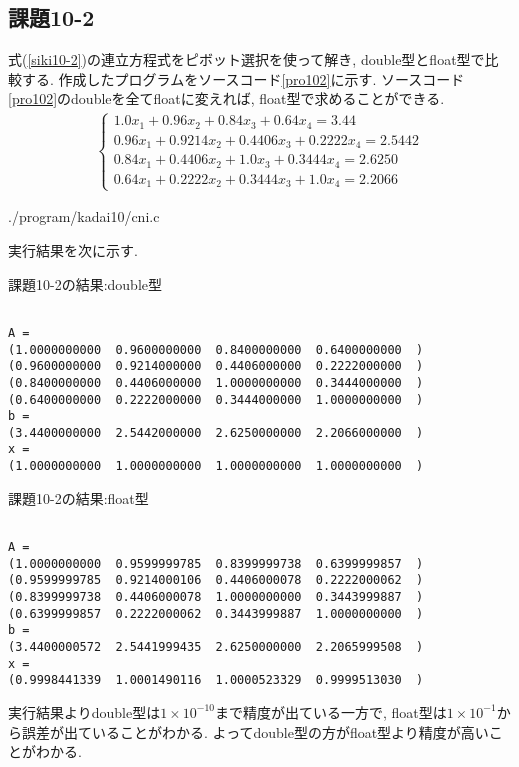 \documentclass[a4j]{jsarticle}
\begin{document}
\subsection{課題10-2}
式(\ref{siki10-2})の連立方程式をピボット選択を使って解き,
double型とfloat型で比較する.
作成したプログラムをソースコード\ref{pro102}に示す.
ソースコード\ref{pro102}のdoubleを全てfloatに変えれば,
float型で求めることができる.
\begin{eqnarray}
 \begin{cases}
  1.0x_1  + 0.96x_2   +   0.84x_3 +   0.64x_4 = 3.44\\
  0.96x_1 + 0.9214x_2 + 0.4406x_3 + 0.2222x_4 = 2.5442\\
  0.84x_1 + 0.4406x_2 +    1.0x_3 + 0.3444x_4 = 2.6250\\
  0.64x_1 + 0.2222x_2 + 0.3444x_3 +    1.0x_4 = 2.2066
 \end{cases}
 \label{siki10-2}
\end{eqnarray}

{./program/kadai10/cni.c}

実行結果を次に示す.
\begin{breakitembox}[l]{課題10-2の結果:double型}
\begin{verbatim}

A =
(1.0000000000  0.9600000000  0.8400000000  0.6400000000  )
(0.9600000000  0.9214000000  0.4406000000  0.2222000000  )
(0.8400000000  0.4406000000  1.0000000000  0.3444000000  )
(0.6400000000  0.2222000000  0.3444000000  1.0000000000  )
b =
(3.4400000000  2.5442000000  2.6250000000  2.2066000000  )
x =
(1.0000000000  1.0000000000  1.0000000000  1.0000000000  )
\end{verbatim}
\end{breakitembox}

\begin{breakitembox}[l]{課題10-2の結果:float型}
\begin{verbatim}

A =
(1.0000000000  0.9599999785  0.8399999738  0.6399999857  )
(0.9599999785  0.9214000106  0.4406000078  0.2222000062  )
(0.8399999738  0.4406000078  1.0000000000  0.3443999887  )
(0.6399999857  0.2222000062  0.3443999887  1.0000000000  )
b =
(3.4400000572  2.5441999435  2.6250000000  2.2065999508  )
x =
(0.9998441339  1.0001490116  1.0000523329  0.9999513030  )
\end{verbatim}
\end{breakitembox}

実行結果よりdouble型は$1\times10^{-10}$まで精度が出ている一方で,
float型は$1\times10^{-1}$から誤差が出ていることがわかる.
よってdouble型の方がfloat型より精度が高いことがわかる.
\end{document}

